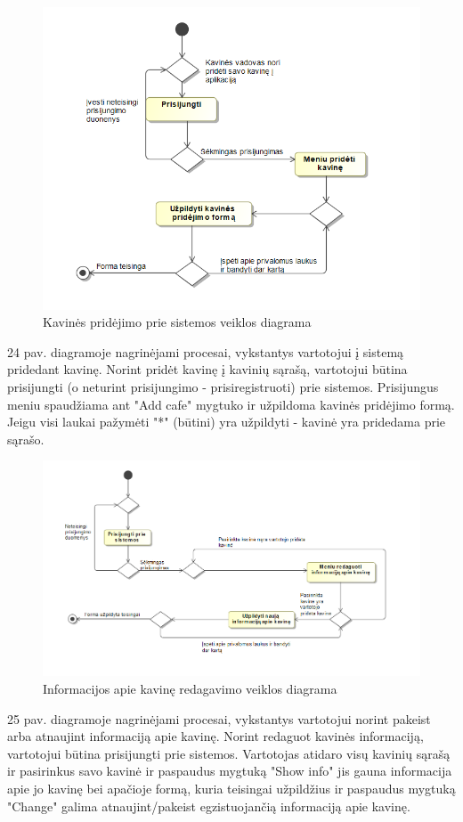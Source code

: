 \documentclass{VUMIFPSkursinis}
\begin{document}
{{{{{\begin{figure}[H]
    \centering
    \includegraphics[width=\textwidth,height=\textheight,keepaspectratio]{img/addcafe} 
    \caption{Kavinės pridėjimo prie sistemos veiklos diagrama}
    \label{img:addcafe}
\end{figure}
24 pav.   diagramoje nagrinėjami procesai, vykstantys vartotojui į sistemą pridedant kavinę. Norint pridėt kavinę į kavinių sąrašą, vartotojui būtina prisijungti (o neturint prisijungimo - prisiregistruoti) prie sistemos. Prisijungus meniu spaudžiama ant "Add cafe" mygtuko ir užpildoma kavinės pridėjimo formą. Jeigu visi laukai pažymėti "*" (būtini) yra užpildyti - kavinė yra pridedama prie sąrašo. 

\begin{figure}[H]
    \centering
    \includegraphics[width=\textwidth,height=\textheight,keepaspectratio]{img/editcafe} 
    \caption{Informacijos apie kavinę redagavimo veiklos diagrama}
    \label{img:editcafe}
\end{figure}
25 pav.   diagramoje nagrinėjami procesai, vykstantys vartotojui norint pakeist arba atnaujint informaciją apie kavinę. Norint redaguot kavinės informaciją, vartotojui būtina prisijungti prie sistemos. Vartotojas atidaro visų kavinių sąrašą ir pasirinkus savo kavinė ir paspaudus mygtuką "Show info" jis gauna informacija apie jo kavinę bei apačioje formą, kuria teisingai užpildžius ir paspaudus mygtuką "Change" galima atnaujint/pakeist egzistuojančią informaciją apie kavinę.


}}}}}
\end{document}
